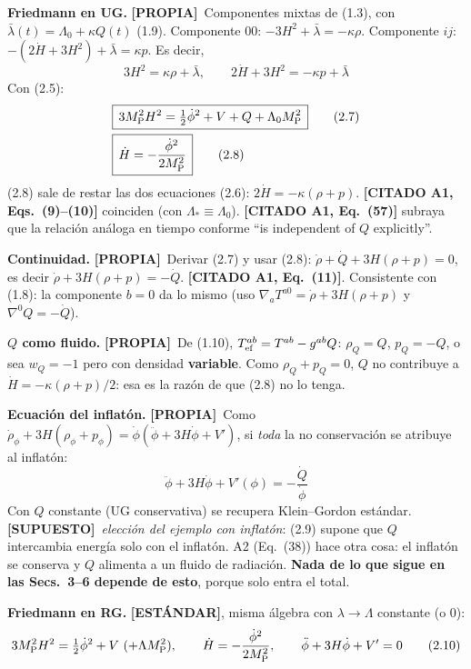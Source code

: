 \documentclass[11pt,a4paper]{article}
\newcommand{\MP}{M_{\rm P}}
\newcommand{\propia}{{\bfseries\color{TealBlue}[PROPIA]}}
\newcommand{\estandar}{{\bfseries\color{BurntOrange}[ESTÁNDAR]}}
\newcommand{\supuesto}{{\bfseries\color{Plum}[SUPUESTO]}}
\newcommand{\citado}[1]{{\bfseries\color{RoyalBlue}[CITADO #1]}}
\newcommand{\sub}[2]{\par\medskip\noindent{\bfseries\color{NavyBlue}#1}\quad\textbf{#2}}
\begin{document}
\sub{2.4}{Friedmann en UG.} \propia\ Componentes mixtas de (1.3), con $\bar\lambda(t)=\Lambda_0+\kappa Q(t)$ (1.9). Componente $00$: $-3H^2+\bar\lambda=-\kappa\rho$. Componente $ij$: $-(2\dot H+3H^2)+\bar\lambda=\kappa p$. Es decir,
\begin{equation}
3H^2=\kappa\rho+\bar\lambda,\qquad 2\dot H+3H^2=-\kappa p+\bar\lambda\tag{2.6}
\end{equation}
Con (2.5):
\begin{align}
&\boxed{\,3\MP^2H^2=\tfrac12\dot\phi^2+V+Q+\Lambda_0\MP^2\,}\tag{2.7}\\
&\boxed{\,\dot H=-\frac{\dot\phi^2}{2\MP^2}\,}\tag{2.8}
\end{align}
(2.8) sale de restar las dos ecuaciones (2.6): $2\dot H=-\kappa(\rho+p)$. \citado{A1, Eqs.~(9)--(10)} coinciden (con $\Lambda_*\equiv\Lambda_0$). \citado{A1, Eq.~(57)} subraya que la relación análoga en tiempo conforme ``is independent of $Q$ explicitly''.

\smallskip\noindent\textbf{Continuidad.} \propia\ Derivar (2.7) y usar (2.8): $\dot\rho+\dot Q+3H(\rho+p)=0$, es decir $\dot\rho+3H(\rho+p)=-\dot Q$. \citado{A1, Eq.~(11)}. Consistente con (1.8): la componente $b=0$ da lo mismo (uso $\nabla_aT^{a0}=\dot\rho+3H(\rho+p)$ y $\nabla^0Q=-\dot Q$).

\smallskip\noindent\textbf{$Q$ como fluido.} \propia\ De (1.10), $T^{ab}_{\rm ef}=T^{ab}-g^{ab}Q$: $\rho_Q=Q$, $p_Q=-Q$, o sea $w_Q=-1$ pero con densidad \textbf{variable}. Como $\rho_Q+p_Q=0$, $Q$ no contribuye a $\dot H=-\kappa(\rho+p)/2$: esa es la razón de que (2.8) no lo tenga.

\smallskip\noindent\textbf{Ecuación del inflatón.} \propia\ Como $\dot\rho_\phi+3H(\rho_\phi+p_\phi)=\dot\phi(\ddot\phi+3H\dot\phi+V')$, si \emph{toda} la no conservación se atribuye al inflatón:
\begin{equation}
\ddot\phi+3H\dot\phi+V'(\phi)=-\frac{\dot Q}{\dot\phi}\tag{2.9}
\end{equation}
Con $Q$ constante (UG conservativa) se recupera Klein--Gordon estándar. \supuesto\ \emph{elección del ejemplo con inflatón}: (2.9) supone que $Q$ intercambia energía solo con el inflatón. A2 (Eq.~(38)) hace otra cosa: el inflatón se conserva y $Q$ alimenta a un fluido de radiación. \textbf{Nada de lo que sigue en las Secs.~3--6 depende de esto}, porque solo entra el total.

\sub{2.5}{Friedmann en RG.} \estandar, misma álgebra con $\lambda\to\Lambda$ constante (o $0$):
\begin{equation}
3\MP^2H^2=\tfrac12\dot\phi^2+V\ (+\Lambda\MP^2),\qquad\dot H=-\frac{\dot\phi^2}{2\MP^2},\qquad\ddot\phi+3H\dot\phi+V'=0\tag{2.10}
\end{equation}
\end{document}
